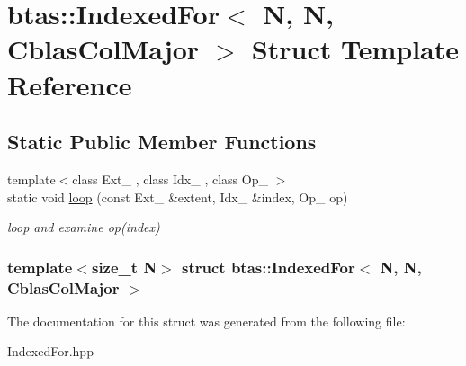\hypertarget{structbtas_1_1_indexed_for_3_01_n_00_01_n_00_01_cblas_col_major_01_4}{
\section{btas::IndexedFor$<$ N, N, CblasColMajor $>$ Struct Template Reference}
\label{structbtas_1_1_indexed_for_3_01_n_00_01_n_00_01_cblas_col_major_01_4}
}
\subsection*{Static Public Member Functions}
\begin{DoxyCompactItemize}
\item 
\hypertarget{structbtas_1_1_indexed_for_3_01_n_00_01_n_00_01_cblas_col_major_01_4_ad17cb4153386116ca01f9823a426d3ed}{
{\footnotesize template$<$class Ext\_\- , class Idx\_\- , class Op\_\- $>$ }\\static void \hyperlink{structbtas_1_1_indexed_for_3_01_n_00_01_n_00_01_cblas_col_major_01_4_ad17cb4153386116ca01f9823a426d3ed}{loop} (const Ext\_\- \&extent, Idx\_\- \&index, Op\_\- op)}
\label{structbtas_1_1_indexed_for_3_01_n_00_01_n_00_01_cblas_col_major_01_4_ad17cb4153386116ca01f9823a426d3ed}

\begin{DoxyCompactList}\small\item\em loop and examine op(index) \item\end{DoxyCompactList}\end{DoxyCompactItemize}
\subsubsection*{template$<$size\_\-t N$>$ struct btas::IndexedFor$<$ N, N, CblasColMajor $>$}



The documentation for this struct was generated from the following file:\begin{DoxyCompactItemize}
\item 
IndexedFor.hpp\end{DoxyCompactItemize}
